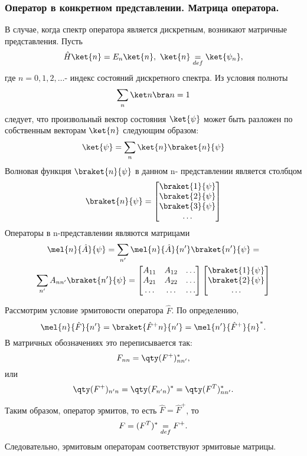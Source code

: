\subsubsection{{Оператор в конкретном представлении. Матрица оператора.}}

В случае, когда спектр оператора является дискретным, возникают матричные представления. Пусть
$$\hat H \ket{n} = E_n \ket{n}, ~ \ket{n}\definition\ket{\psi_n}, $$
где $n=0,1,2,\dots$- индекс состояний дискретного спектра. Из условия полноты
$$\sum_n \ket n \bra n = 1$$
следует, что произвольный вектор состояния $\ket{\psi}$
может быть разложен по собственным векторам $\ket{n}$ следующим образом:
$$\ket{\psi}=\sum\limits_n \ket{n} \braket{n}{\psi} $$
Волновая функция $\braket{n}{\psi}$ в данном n- представлении является столбцом
$$
\braket{n}{\psi}=\begin{bmatrix}\braket{1}{\psi}\\
				\braket{2}{\psi}\\
				\braket{3}{\psi}\\
				\dots \end{bmatrix}
$$
Операторы в n-представлении являются матрицами
\begin{gather*}
\mel{n}{\hat A}{\psi}=\sum\limits_{n'} \mel{n}{\hat A}{n'}\braket{n'}{\psi}=\\
\sum\limits_{n'} A_{nn'}\braket{n'}{\psi}=
	\begin{bmatrix}
		A_{11} & A_{12} & \dots \\
		A_{21} & A_{22} & \dots \\
		\dots  & \dots	& \dots \\
	\end{bmatrix}
	\begin{bmatrix}
		\braket{1}{\psi} \\
		\braket{2}{\psi} \\
		\dots
	\end{bmatrix}
\end{gather*}

Рассмотрим условие эрмитовости оператора $\hat F$. По определению,
$$\mel{n}{\hat F}{n'}=\braket{\hat F^+ n}{n'}=\mel{n'}{\hat F^+}{n}^*.$$
В матричных обозначениях это переписывается так:
$$ F_{nn}=\qty(F^+)^*_{nn'}, $$
или
$$ \qty(F^+)_{n'n}=\qty(F_{n'n})^*=\qty(F^T)^*_{nn'}.$$

Таким образом, оператор эрмитов, то есть $\hat F= \hat F^+$, то
$$F=(F^T)^*\underset{def}{=} F^+ .$$
Следовательно, эрмитовым операторам соответствуют эрмитовые матрицы.

